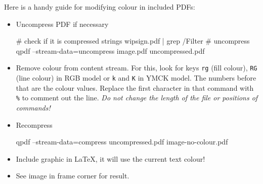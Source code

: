 \documentclass[mathserif, fleqn, aspectratio=169]{beamer}
\begin{document}
\begin{frame}
  \scriptsize
  Here is a handy guide for modifying colour in included PDFs:
  \begin{itemize}
  \item Uncompress PDF if necessary
    \begin{shell}[]
# check if it is compressed
strings wipsign.pdf | grep /Filter
# uncompress
qpdf --stream-data=uncompress image.pdf uncompressed.pdf
    \end{shell}
  \item Remove colour from content stream. For this, look for keys \verb$rg$ (fill colour), \verb$RG$ (line colour) in RGB model or \verb$k$ and \verb$K$ in YMCK model. The numbers before that are the colour values.
    Replace the first character in that command with \verb$%$ to comment out the line. \emph{Do not change the length of the file or positions of commands!}
  \item Recompress
    \begin{shell}[]
qpdf --stream-data=compress uncompressed.pdf image-no-colour.pdf
    \end{shell}
  \item Include graphic in \LaTeX, it will use the current text colour!
  \item See image in frame corner for result.
  \end{itemize}
\end{frame}
\end{document}

